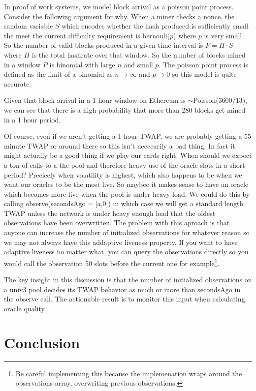 \documentclass[a4paper, 11pt]{article}
\begin{document}
In proof of work systems, we model block arrival as a poisson point process. Consider the following argument for why. 
When a miner checks a nonce, the random variable $S$ which encodes whether the hash produced is sufficiently small the meet the current difficulty requirement is bernouli($p$) where $p$ is very small. 
So the number of valid blocks produced in a given time interval is $P = H \cdot S$ where $H$ is the total hashrate over that window. So the number of blocks mined in a window $P$ is binomial with large $n$ and small $p$. The poisson point process is defined as the limit of a binomial as $n \to \infty$ and $p \to 0$ so this model is quite accurate. 

Given that block arrival in a 1 hour window on Ethereum is $\sim$Poisson($3600/13$), we can see that there is a high probability that more than 280 blocks get mined in a 1 hour period.

Of course, even if we aren't getting a 1 hour TWAP, we are probably getting a 55 minute TWAP or around there so this isn't neccearily a bad thing. In fact it might actually be a good thing if we play our cards right.
When should we expect a ton of calls to a the pool and therefore heavy use of the oracle slots in a short period? 
Precicely when volatility is highest, which also happens to be when we want our oracles to be the most live. So maybee it makes sense to have an oracle which becomes more live when the pool is under heavy load. We could do this by calling observe(secondsAgo = [a,0]) in which case we will get a standard length TWAP unless the network is under heavy enough load that the oldest observations have been overwritten.
The problem with this aproach is that anyone can increase the number of initialized observations for whatever reason so we may not always have this addaptive liveness property.
If you want to have adaptive liveness no matter what, you can query the observations directly so you would call the observation 50 slots before the current one for example\footnote{Be careful implementing this because the implemenation wraps around the observations array, overwriting previous observations.}.

The key insight in this discussion is that the number of initialized observations on a univ3 pool decides its TWAP behavior as much or more than secondsAgo in the observe call. The actionable result is to monitor this input when calculating oracle quality. 
\section{Conclusion}
\end{document}
